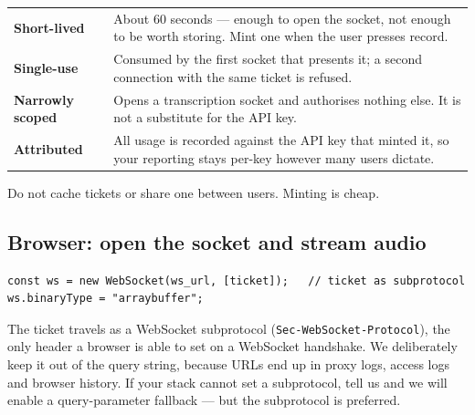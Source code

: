 \documentclass[11pt,a4paper]{article}
\begin{document}
\begin{center}
\renewcommand{\arraystretch}{1.35}
\begin{tabular}{@{}>{\bfseries}p{3.1cm}p{11.2cm}@{}}
\toprule
Short-lived    & About 60 seconds --- enough to open the socket, not enough to be worth
                 storing. Mint one when the user presses record. \\
Single-use     & Consumed by the first socket that presents it; a second connection with
                 the same ticket is refused. \\
Narrowly scoped & Opens a transcription socket and authorises nothing else. It is not a
                 substitute for the API key. \\
Attributed     & All usage is recorded against the API key that minted it, so your
                 reporting stays per-key however many users dictate. \\
\bottomrule
\end{tabular}
\end{center}

\noindent Do not cache tickets or share one between users. Minting is cheap.

\subsection{Browser: open the socket and stream audio}

\begin{lstlisting}
const ws = new WebSocket(ws_url, [ticket]);   // ticket as subprotocol
ws.binaryType = "arraybuffer";
\end{lstlisting}

The ticket travels as a WebSocket subprotocol (\texttt{Sec-WebSocket-Protocol}), the only
header a browser is able to set on a WebSocket handshake. We deliberately keep it out of
the query string, because URLs end up in proxy logs, access logs and browser history. If
your stack cannot set a subprotocol, tell us and we will enable a query-parameter
fallback --- but the subprotocol is preferred.
\end{document}
